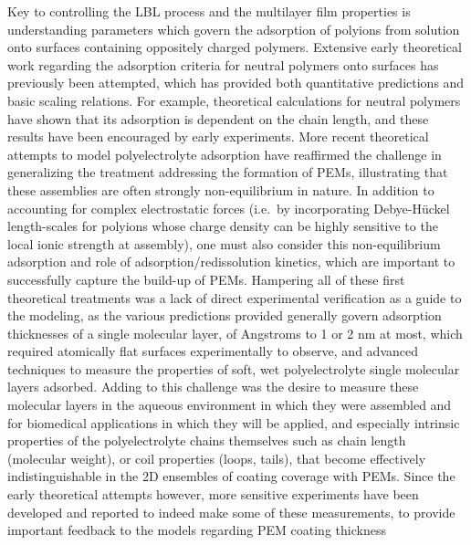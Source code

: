 \documentclass[journal=mamobx,manuscript=article]{achemso}
\begin{document}
Key to controlling the LBL process and the multilayer film properties is understanding parameters which govern the adsorption of polyions from solution onto surfaces containing oppositely charged polymers\cite{Schonhoff2003}.  
Extensive early theoretical work regarding the adsorption criteria for neutral polymers onto surfaces has previously been attempted, which has provided both quantitative predictions\cite{Fleer1982,Baumgartner1991} and basic scaling relations.\cite{DeGennes1976,Alexander1977}  
For example, theoretical calculations for neutral polymers have shown that its adsorption is dependent on the chain length,\cite{Stuart1980} and these results have been encouraged by early experiments.\cite{Stuart1980,Felter1970}  
More recent theoretical attempts to model polyelectrolyte adsorption have reaffirmed the challenge in generalizing the treatment addressing the formation of PEMs\cite{Szilagyi2014}, illustrating that these assemblies are often strongly non-equilibrium in nature.  In addition to accounting for complex electrostatic forces (i.e.\ by incorporating Debye-H\"uckel length-scales for polyions whose charge density can be highly sensitive to the local ionic strength at assembly),\cite{Chatellier1996} one must also consider this non-equilibrium adsorption and role of adsorption/redissolution kinetics, %
which are important to successfully capture the build-up of PEMs.\cite{Kovacevic2002} 
Hampering all of these first theoretical treatments was a lack of direct experimental verification as a guide to the modeling, as the various predictions provided generally govern adsorption thicknesses of a single molecular layer, of Angstroms to 1 or 2 nm at most, which required atomically flat surfaces experimentally to observe, and advanced techniques to measure the properties of soft, wet polyelectrolyte single molecular layers adsorbed.  Adding to this challenge was the desire to measure these molecular layers in the aqueous environment in which they were assembled and for biomedical applications in which they will be applied, and especially intrinsic properties of the polyelectrolyte chains themselves such as chain length (molecular weight), or coil properties (loops, tails), that become effectively indistinguishable in the 2D ensembles of coating coverage with PEMs.   Since the early theoretical attempts however, more sensitive experiments have been developed and reported to indeed make some of these measurements, to provide important feedback to the models regarding PEM coating thickness 
\end{document}
